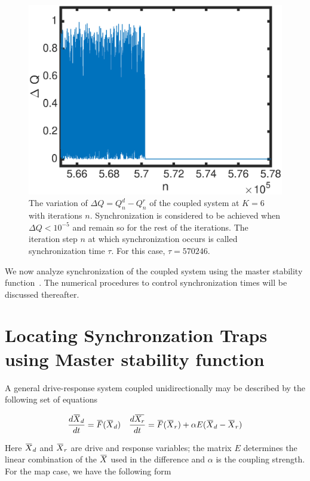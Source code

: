 \documentclass[preprint,showpacs,preprintnumbers,amsmath,amssymb]{revtex4-1}
\newcommand{\overbar}[1]{\mkern 1.5mu\overline{\mkern-1.5mu#1\mkern-1.5mu}\mkern 1.5mu}
\begin{document}
\begin{figure}[t]
\includegraphics[scale=.6]{Sync_exmaple}
\caption{\label{fig:sync_ex} \footnotesize The variation of $\Delta Q = Q^d_n-Q^r_n$ of the coupled system at $K = 6$ with iterations $n$. Synchronization is considered to be achieved when $\Delta Q < 10^{-5}$ and remain so for the rest of the iterations. The iteration step $n$ at which synchronization occurs is called synchronization time $\tau$. For this case, $\tau = 570 246.$ }
\end{figure}

We now analyze synchronization of the coupled system using the master stability function~\cite{Pecora1998}. The numerical procedures to control synchronization times will be discussed thereafter.  

\section{Locating Synchronzation Traps using Master stability function}
\label{Master stability function}
A general drive-response system coupled unidirectionally may be described by the following set of equations

\begin{align}
\frac{d\overbar{X}_d}{dt} = \overbar{F}(\overbar{X}_d) \nonumber  &&
\frac{d\overbar{X_r}}{dt} = \overbar{F}(\overbar{X}_r) + \alpha E(\overbar{X}_d-\overbar{X}_r)
\end{align}

Here $\overbar{X}_d$ and $\overbar{X}_r$ are drive and response variables; the matrix $E$ determines the linear combination of the $\overbar{X}$ used in the difference and $\alpha$ is the coupling strength. For the map case, we have the following form
\end{document}
